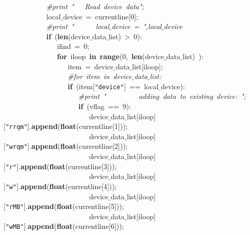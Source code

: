 \mbox{}\ \ \ \ \ \ \ \ \ \ \ \ \textit{\#print\ "{}\ \ \ Read\ device\ data"{};} \\
\mbox{}\ \ \ \ \ \ \ \ \ \ \ \ local$\_$device\ =\ currentline[0]; \\
\mbox{}\ \ \ \ \ \ \ \ \ \ \ \ \textit{\#print\ "{}\ \ \ \ \ \ local$\_$device\ =\ "{},local$\_$device} \\
\mbox{}\ \ \ \ \ \ \ \ \ \ \ \ \textbf{if}\ (\textbf{len}(device$\_$data$\_$list)\ \textgreater{}\ 0): \\
\mbox{}\ \ \ \ \ \ \ \ \ \ \ \ \ \ \ ifind\ =\ 0; \\
\mbox{}\ \ \ \ \ \ \ \ \ \ \ \ \ \ \ \textbf{for}\ iloop\ \textbf{in}\ \textbf{range}(0,\ \textbf{len}(device$\_$data$\_$list)\ ): \\
\mbox{}\ \ \ \ \ \ \ \ \ \ \ \ \ \ \ \ \ \ item\ =\ device$\_$data$\_$list[iloop]; \\
\mbox{}\ \ \ \ \ \ \ \ \ \ \ \ \ \ \ \ \ \ \textit{\#for\ item\ in\ device$\_$data$\_$list:} \\
\mbox{}\ \ \ \ \ \ \ \ \ \ \ \ \ \ \ \ \ \ \textbf{if}\ (item[\texttt{"{}device"{}}]\ ==\ local$\_$device): \\
\mbox{}\ \ \ \ \ \ \ \ \ \ \ \ \ \ \ \ \ \ \ \ \ \textit{\#print\ "{}\ \ \ \ \ \ \ \ \ adding\ data\ to\ existing\ device:\ "{};} \\
\mbox{}\ \ \ \ \ \ \ \ \ \ \ \ \ \ \ \ \ \ \ \ \ \textbf{if}\ (vflag\ ==\ 9): \\
\mbox{}\ \ \ \ \ \ \ \ \ \ \ \ \ \ \ \ \ \ \ \ \ \ \ \ device$\_$data$\_$list[iloop][\texttt{"{}rrqm"{}}].\textbf{append}(\textbf{float}(currentline[1])); \\
\mbox{}\ \ \ \ \ \ \ \ \ \ \ \ \ \ \ \ \ \ \ \ \ \ \ \ device$\_$data$\_$list[iloop][\texttt{"{}wrqm"{}}].\textbf{append}(\textbf{float}(currentline[2])); \\
\mbox{}\ \ \ \ \ \ \ \ \ \ \ \ \ \ \ \ \ \ \ \ \ \ \ \ device$\_$data$\_$list[iloop][\texttt{"{}r"{}}].\textbf{append}(\textbf{float}(currentline[3])); \\
\mbox{}\ \ \ \ \ \ \ \ \ \ \ \ \ \ \ \ \ \ \ \ \ \ \ \ device$\_$data$\_$list[iloop][\texttt{"{}w"{}}].\textbf{append}(\textbf{float}(currentline[4])); \\
\mbox{}\ \ \ \ \ \ \ \ \ \ \ \ \ \ \ \ \ \ \ \ \ \ \ \ device$\_$data$\_$list[iloop][\texttt{"{}rMB"{}}].\textbf{append}(\textbf{float}(currentline[5])); \\
\mbox{}\ \ \ \ \ \ \ \ \ \ \ \ \ \ \ \ \ \ \ \ \ \ \ \ device$\_$data$\_$list[iloop][\texttt{"{}wMB"{}}].\textbf{append}(\textbf{float}(currentline[6])); \\

